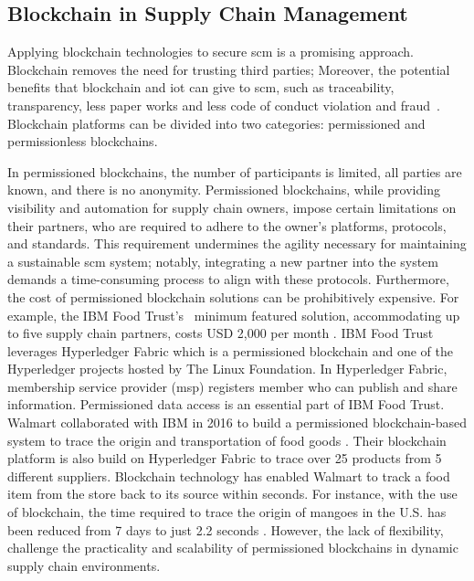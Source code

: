 \subsection{Blockchain in Supply Chain Management} \label{sec:lit_bc_in_scm}

Applying blockchain technologies to secure \gls{scm} is a promising approach. Blockchain removes the need for trusting third parties; Moreover, the potential benefits that blockchain and \gls{iot} can give to \gls{scm}, such as traceability, transparency, less paper works and less code of conduct violation and fraud~\cite{Aich2019}.  Blockchain platforms can be divided into two categories: permissioned and permissionless blockchains. 

In permissioned blockchains, the number of participants is limited, all parties are known, and there is no anonymity. Permissioned blockchains, while providing visibility and automation for supply chain owners, impose certain limitations on their partners, who are required to adhere to the owner's platforms, protocols, and standards. This requirement undermines the agility necessary for maintaining a sustainable \gls{scm} system; notably, integrating a new partner into the system demands a time-consuming process to align with these protocols. Furthermore, the cost of permissioned blockchain solutions can be prohibitively expensive. For example, the IBM Food Trust's~\cite{IBM-SCM}  minimum featured solution, accommodating up to five supply chain partners, costs USD 2,000 per month \cite{IBMFoodTrust}. 
 IBM Food Trust leverages Hyperledger Fabric \cite{Fabric} which is a permissioned blockchain and one of the Hyperledger projects hosted by The Linux Foundation. In Hyperledger Fabric, membership service provider (\gls{msp}) registers member who can publish and share information. Permissioned data access is an essential part of IBM Food Trust. Walmart collaborated with IBM in 2016 to build a permissioned blockchain-based system to trace the origin and transportation of food goods \cite{HELO2019242}. Their blockchain platform is also build on Hyperledger Fabric to trace over 25 products from 5 different suppliers. Blockchain technology has enabled Walmart to track a food item from the store back to its source within seconds. For instance, with the use of blockchain, the time required to trace the origin of mangoes in the U.S. has been reduced from 7 days to just 2.2 seconds \cite{Walmart}.  However, the lack of flexibility, challenge the practicality and scalability of permissioned blockchains in dynamic supply chain environments.


